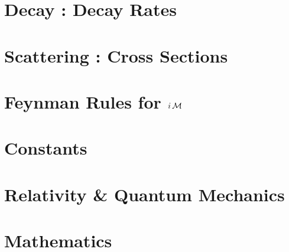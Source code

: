 \documentclass[landscape,8pt,a4paper,english]{extarticle}
\begin{document}
\begin{multicols*}{3}
        \section*{Decay : Decay Rates}
        \section*{Scattering : Cross Sections}
        \section*{Feynman Rules for $i\operatorname{\mathcal{M}}$}
        \section*{Constants}
        \section*{Relativity \& Quantum Mechanics}
        \section*{Mathematics}
\end{multicols*}
\end{document}
